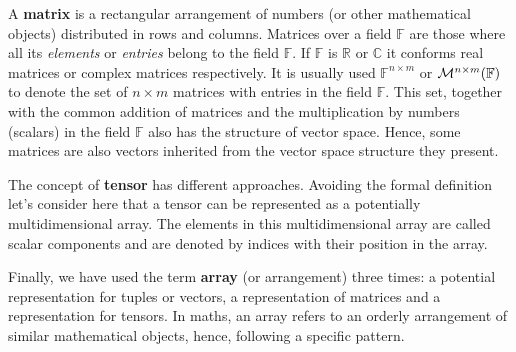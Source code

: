 A \textbf{matrix} is a rectangular arrangement of numbers (or other mathematical objects) distributed in rows and columns.
Matrices over a field $\mathbb{F}$ are those where all its \textit{elements} or \textit{entries} belong to the field $\mathbb{F}$.
If $\mathbb{F}$ is $\mathbb{R}$ or $\mathbb{C}$ it conforms real matrices or complex matrices respectively.
It is usually used $\mathbb{F}^{n\times m}$ or ${\cal{M}}^{n \times m} (\mathbb{F})$ to denote 
the set of $n\times m$ matrices with entries in the field $\mathbb{F}$. 
This set, together with the common addition of matrices and the multiplication by numbers (scalars) 
in the field $\mathbb{F}$ also has the structure of vector space. 
Hence, some matrices are also vectors inherited from the vector space structure they present.

The concept of \textbf{tensor} has different approaches. 
Avoiding the formal definition let's consider here that a tensor can be represented as a potentially multidimensional array.
The elements in this multidimensional array are called scalar components and are denoted by indices with their position in the array.

Finally, we have used the term \textbf{array} (or arrangement) three times: 
a potential representation for tuples or vectors, 
a representation of matrices and a representation for tensors. 
In maths, an array refers to an orderly arrangement of similar 
mathematical objects, hence, following a specific pattern.

